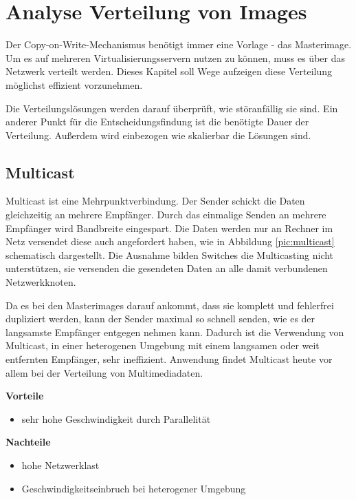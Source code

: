 \chapter{Analyse Verteilung von Images}
Der Copy-on-Write-Mechanismus benötigt immer eine Vorlage - das Masterimage. Um es auf mehreren Virtualisierungsservern nutzen zu können, muss es über das Netzwerk verteilt werden. Dieses Kapitel soll Wege aufzeigen diese Verteilung möglichst effizient vorzunehmen.

Die Verteilungslösungen werden darauf überprüft, wie störanfällig sie sind. Ein anderer Punkt für die Entscheidungsfindung ist die benötigte Dauer der Verteilung. Außerdem wird einbezogen wie skalierbar die Lösungen sind.

\section{Multicast}
Multicast ist eine Mehrpunktverbindung. Der Sender schickt die Daten gleichzeitig an mehrere Empfänger. Durch das einmalige Senden an mehrere Empfänger wird Bandbreite eingespart. Die Daten werden nur an Rechner im Netz versendet diese auch angefordert haben, wie in Abbildung \ref{pic:multicast} schematisch dargestellt. Die Ausnahme bilden Switches die Multicasting nicht unterstützen, sie versenden die gesendeten Daten an alle damit verbundenen Netzwerkknoten. 

Da es bei den Masterimages darauf ankommt, dass sie komplett und fehlerfrei dupliziert werden, kann der Sender maximal so schnell senden, wie es der langsamste Empfänger entgegen nehmen kann.  Dadurch ist die Verwendung von Multicast, in einer heterogenen Umgebung mit einem langsamen oder weit entfernten Empfänger, sehr ineffizient. Anwendung findet Multicast heute vor allem bei der Verteilung von Multimediadaten. 


\textbf{Vorteile}
\begin{itemize}
 \item sehr hohe Geschwindigkeit durch Parallelität
\end{itemize}

\textbf{Nachteile}
\begin{itemize}
 \item hohe Netzwerklast
 \item Geschwindigkeitseinbruch bei heterogener Umgebung
\end{itemize}

